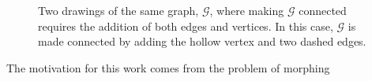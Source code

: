 \documentclass{patmorin}
\begin{document}
\begin{figure}[b]
  \caption{Two drawings of the same graph, $\mathcal{G}$, where making $\mathcal{G}$ connected requires the addition of both edges and vertices. In this case, $\mathcal G$ is made connected by adding the hollow vertex and two dashed edges.}
  \label{fig:bad-example}
\end{figure}

The motivation for this work comes from the problem of morphing
\end{document}
